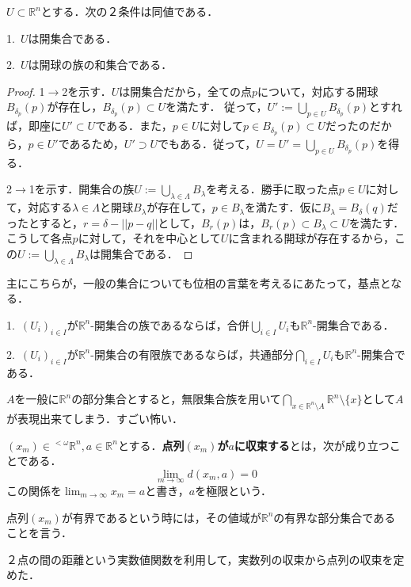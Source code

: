 \documentclass[uplatex, 12pt, dvipdfmx]{jsreport}
\begin{document}
\begin{proposition}[開集合の特徴付け１]\rm{}
    $U\subset\mathbb{R}^n$とする．次の２条件は同値である．

    1.\, $U$は開集合である．

    2.\, $U$は開球の族の和集合である．
    
\end{proposition}
\begin{proof}
    1$\to$2を示す．$U$は開集合だから，全ての点$p$について，対応する開球$B_{\delta_p}(p)$が存在し，$B_{\delta_p}(p)\subset U$を満たす．
    従って，$U':=\bigcup_{p\in U}B_{\delta_p}(p)$とすれば，即座に$U'\subset U$である．また，$p\in U$に対して$p\in B_{\delta_p}(p)\subset U$だったのだから，$p\in U'$であるため，$U'\supset U$でもある．従って，$U=U'=\bigcup_{p\in U}B_{\delta_p}(p)$を得る．

    2$\to$1を示す．開集合の族$U:=\bigcup_{\lambda\in\Lambda}B_\lambda$を考える．勝手に取った点$p\in U$に対して，対応する$\lambda\in\Lambda$と開球$B_\lambda$が存在して，$p\in B_\lambda$を満たす．仮に$B_\lambda=B_{\delta}(q)$だったとすると，$r=\delta -||p-q||$として，$B_{r}(p)$は，$B_{r}(p)\subset B_\lambda\subset U$を満たす．
    こうして各点$p$に対して，それを中心として$U$に含まれる開球が存在するから，この$U:=\bigcup_{\lambda\in\Lambda}B_\lambda$は開集合である．
\end{proof}

主にこちらが，一般の集合についても位相の言葉を考えるにあたって，基点となる．
\begin{proposition}[開集合の特徴付け２]\rm{}

    1.\, $(U_i)_{i\in I}$が$\mathbb{R}^n$-開集合の族であるならば，合併$\bigcup_{i\in I}U_i$も$\mathbb{R}^n$-開集合である．

    2.\, $(U_i)_{i\in I}$が$\mathbb{R}^n$-開集合の有限族であるならば，共通部分$\bigcap_{i\in I}U_i$も$\mathbb{R}^n$-開集合である．
\end{proposition}
\begin{remark}
    $A$を一般に$\mathbb{R}^n$の部分集合とすると，無限集合族を用いて$\bigcap_{x\in\mathbb{R}^n\setminus A}\mathbb{R}^n\setminus\{x\}$として$A$が表現出来てしまう．すごい怖い．
\end{remark}

\begin{definition}[数列の収束の点列への拡張]
    $(x_m)\in{}^{<\omega}\mathbb{R}^n,a\in\mathbb{R}^n$とする．\textbf{点列$(x_m)$が$a$に収束する}とは，次が成り立つことである．
    \[ \lim_{m\to\infty}d(x_m,a)=0 \]
    この関係を$\lim_{m\to\infty}x_m=a$と書き，$a$を極限という．

    点列$(x_m)$が有界であるという時には，その値域が$\mathbb{R}^n$の有界な部分集合であることを言う．

\end{definition}
\begin{remark}
    ２点の間の距離という実数値関数を利用して，実数列の収束から点列の収束を定めた．
\end{remark}
\end{document}
